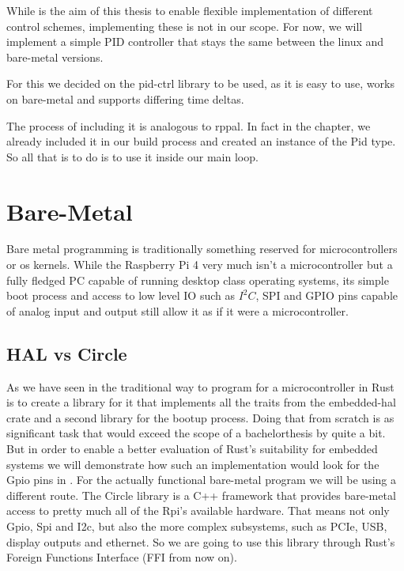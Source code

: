 While is the aim of this thesis to enable flexible implementation of different control schemes, implementing these is not in our scope.
For now, we will implement a simple PID controller that stays the same between the linux and bare-metal versions.

For this we decided on the pid-ctrl library to be used, as it is easy to use, works on bare-metal and supports differing time deltas.

The process of including it is analogous to rppal.
In fact in the  chapter,
we already included it in our build process and created an instance of the Pid type.
So all that is to do is to use it inside our main loop.



\section{Bare-Metal}
\label{sec:concept_and_implementation:bare_metal}

Bare metal programming is traditionally something reserved for microcontrollers or os kernels.
While the Raspberry Pi 4 very much isn't a microcontroller but a fully fledged PC capable of running desktop class operating systems,
its simple boot process and access to low level IO such as $I^2C$, SPI and GPIO pins capable of analog input and output still allow it as if it were a microcontroller.

\subsection{HAL vs Circle}
\label{sec:concept_and_implementation:bare-metal:hal}

As we have seen in  the traditional way to program for a microcontroller in Rust
is to create a library for it that implements all the traits from the embedded-hal crate and a second library for the bootup process.
Doing that from scratch is as significant task that would exceed the scope of a bachelorthesis by quite a bit.
But in order to enable a better evaluation of Rust's suitability for embedded systems we will demonstrate how such an implementation would look for the Gpio pins in .
For the actually functional bare-metal program we will be using a different route.
The Circle library is a C++ framework that provides bare-metal access to pretty much all of the Rpi's available hardware.
That means not only Gpio, Spi and I2c, but also the more complex subsystems, such as PCIe, USB, display outputs and ethernet.
So we are going to use this library through Rust's Foreign Functions Interface (FFI from now on).

